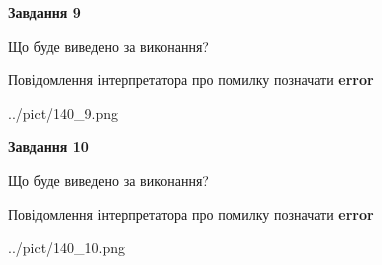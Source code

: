 \documentclass[12pt, ukrainian]{article}
\begin{document}
{{\begin {center}\textbf{Завдання 9}\end {center}}\par
Що буде виведено за виконання? \par
Повідомлення інтерпретатора про помилку позначати \textbf{error}

\begin{center}
	{../pict/140_9.png}
\end{center}
\newpage

{\begin {center}\textbf{Завдання 10}\end {center}}\par
Що буде виведено за виконання? \par
Повідомлення інтерпретатора про помилку позначати \textbf{error}

\begin{center}
	{../pict/140_10.png}
\end{center}
\newpage

}
\end{document}
